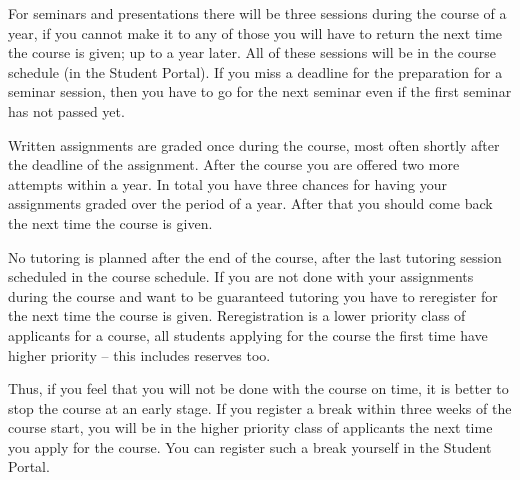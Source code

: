 For seminars and presentations there will be three sessions during the course 
of a year, if you cannot make it to any of those you will have to return the 
next time the course is given; \ie up to a year later.
All of these sessions will be in the course schedule (in the Student Portal).
If you miss a deadline for the preparation for a seminar session, then you have 
to go for the next seminar even if the first seminar has not passed yet.

Written assignments are graded once during the course, most often shortly after 
the deadline of the assignment.
After the course you are offered two more attempts within a year.
In total you have three chances for having your assignments graded over the 
period of a year.
After that you should come back the next time the course is given.

No tutoring is planned after the end of the course, \ie after the last 
tutoring session scheduled in the course schedule.
If you are not done with your assignments during the course and want to be 
guaranteed tutoring you have to reregister for the next time the course is 
given.
Reregistration is a lower priority class of applicants for a course, all 
students applying for the course the first time have higher priority -- this 
includes reserves too.


Thus, if you feel that you will not be done with the course on time, it is 
better to stop the course at an early stage.
If you register a break within three weeks of the course start, you will be in 
the higher priority class of applicants the next time you apply for the course.
You can register such a break yourself in the Student Portal.


\printbibliography{}
